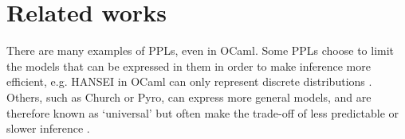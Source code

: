 \section{Related works}
There are many examples of PPLs, even in OCaml. Some PPLs choose to limit the models that can be expressed in them in order to make inference more efficient, e.g. HANSEI in OCaml can only represent discrete distributions \cite{kiselyov2009embedded}. Others, such as Church or Pyro, can express more general models, and are therefore known as `universal' \cite{} but often make the trade-off of less predictable or slower inference \cite{}.

